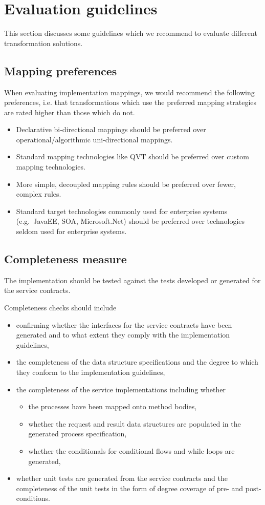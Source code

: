 \section{Evaluation guidelines}

This section discusses some guidelines which we recommend to evaluate different transformation solutions.

\subsection{Mapping preferences}

When evaluating implementation mappings, we would recommend the following preferences, i.e. that transformations which use the preferred mapping strategies are rated higher than those which do not.
\begin{itemize}
  \item Declarative bi-directional mappings should be preferred over operational/algorithmic uni-directional mappings. 
  \item Standard mapping technologies like QVT should be preferred over custom mapping technologies.
  \item More simple, decoupled mapping rules should be preferred over fewer, complex rules.
  \item Standard target technologies commonly used for enterprise systems (e.g.\ JavaEE, SOA, Microsoft.Net) should be preferred over technologies seldom used for enterprise systems.
\end{itemize}

\subsection{Completeness measure}
The implementation should be tested against the tests developed or generated for the service contracts. 

Completeness checks should include
\begin{itemize}
  \item confirming whether the interfaces for the service contracts have been generated and to what extent they comply with the implementation guidelines,
  \item the completeness of the data structure specifications and the degree to which they conform to the implementation guidelines,
  \item the completeness of the service implementations including whether
    \begin{itemize}
     \item the processes have been mapped onto method bodies,
     \item whether the request and result data structures are populated in the generated process specification,
     \item whether the conditionals for conditional flows and while loops are generated,
    \end{itemize}
  \item whether unit tests are generated from the service contracts and the completeness of the unit tests in the form of degree coverage of pre- and post-conditions.
\end{itemize}

